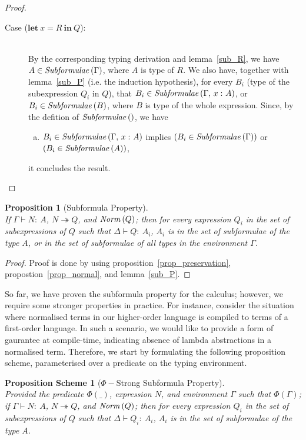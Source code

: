 \documentclass[a4paper]{article}
\newcommand{\typecolor}{}
\newcommand{\termcolor}{}
\newcommand{\tp}[1]{{\typecolor #1}}
\newcommand{\tm}[1]{{\termcolor #1}}
\newtheorem{proposition}[theorem]{Proposition}
\newtheorem{scheme}[theorem]{Proposition Scheme}
\newcommand{\expshr}[3]{\mathbf{let}\ #1\boldsymbol{=}#2\ \mathbf{in}\ #3}
\newcommand{\typing}[2]{\tm{#1:\ }\tp{#2}}
\newcommand{\typenvcon}[2]{\tp{\Gamma,}\ \typing{#1}{#2}}
\newcommand{\txt}[1]{\text{\textit{#1}}}
\newcommand{\reducestar}[3]{#1 \overset{#2}\twoheadrightarrow #3}
\newcommand{\subformulae}[1]{\txt{Subformulae}\,(#1)}
\newcommand{\norm}[1]{\txt{Norm}\,(#1)}
\begin{document}
\begin{proof}
\begin{description}
\item[Case ($\expshr{x}{R}{Q}$):]\ \\
  By the corresponding typing derivation and lemma~\ref{sub_R}, we
  have $A \in \subformulae{\Gamma}$, where $A$ is type of $R$. We also
  have, together with lemma~\ref{sub_P} (i.e. the induction
  hypothesis), for every $B_i$ (type of the subexpression $Q_i$ in
  $Q$), that $B_i \in \subformulae{\typenvcon{x}{A}}$, or $B_i \in
  \subformulae{B}$, where $B$ is type of the whole expression. Since, by the defition of $\subformulae{}$, we have
  \begin{enumerate}[(a)] 
     \item $B_i \in \subformulae{\typenvcon{x}{A}}$ implies $(B_i \in \subformulae{\Gamma})$ or $(B_i \in \subformulae{A})$,
  \end{enumerate}
  it concludes the result.
\end{description}
\end{proof}

\begin{proposition}[Subformula Property]\ \\
\label{prop_subformula}
If $\Gamma \vdash \typing{N}{A}$, $\reducestar{N}{}{Q}$, and $\norm{Q}$;
then for every expression $Q_i$ in the set of subexpressions of $Q$ such
that $\Delta \vdash \typing{Q}{A_i}$, $A_i$ is in the set of subformulae of
the type $A$, or in the set of subformulae of all types in the
environment $\Gamma$.
\end{proposition}
\begin{proof}
Proof is done by using proposition~\ref{prop_preservation},
propostion~\ref{prop_normal}, and lemma~\ref{sub_P}.
\end{proof}

So far, we have proven the subformula property for the calculus;
however, we require some stronger properties in practice. For
instance, consider the situation where normalised terms in our
higher-order language is compiled to terms of a first-order
language. In such a scenario, we would like to provide a form of
gaurantee at compile-time, indicating absence of lambda abstractions
in a normalised term. Therefore, we start by formulating the following
proposition scheme, parameterised over a predicate on the typing
environment.

\begin{scheme}[$\Phi-$Strong Subformula Property]\ \\
\label{sub_scheme}
Provided the predicate $\Phi(\_)$, expression $N$, and environment
$\Gamma$ such that $\Phi(\Gamma)$; if $\Gamma \vdash \typing{N}{A}$,
$\reducestar{N}{}{Q}$, and $\norm{Q}$; then for every expression $Q_i$
in the set of subexpressions of $Q$ such that $\Delta \vdash
\typing{Q_i}{A_i}$, $A_i$ is in the set of subformulae of the type
$A$.
\end{scheme}
\end{document}
